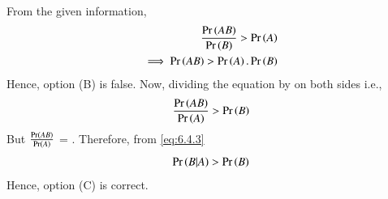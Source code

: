 From the given information,
\begin{align}
    \label{eq:6.4.1}
    \frac{\Pr\left(AB\right)}{\Pr\left(B\right)}>\Pr\left(A\right)\\
    \label{eq:6.4.2}
    \implies \Pr\left(AB\right)>\Pr\left(A\right).\Pr\left(B\right)
\end{align}
Hence, option (B) is false. Now, dividing the equation by  on both sides i.e.,
\begin{align}
    \label{eq:6.4.3}
    \frac{\Pr\left(AB\right)}{\Pr\left(A\right)}>\Pr\left(B\right)   
\end{align}
But $\frac{\Pr\left(AB\right)}{\Pr\left(A\right)}$ = . Therefore, from     \eqref{eq:6.4.3}
\begin{align}
    \label{eq:6.4.4}
    \Pr\left(B|A\right)>\Pr\left(B\right)
\end{align}
Hence, option (C) is correct.
